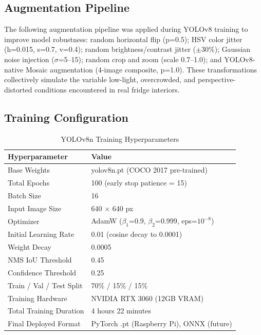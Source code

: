 \documentclass[12pt,a4paper]{report}
\begin{document}
\subsection{Augmentation Pipeline}
The following augmentation pipeline was applied during YOLOv8 training to improve model robustness: random horizontal flip (p=0.5); HSV color jitter (h=0.015, s=0.7, v=0.4); random brightness/contrast jitter ($\pm$30\%); Gaussian noise injection ($\sigma$=5--15); random crop and zoom (scale 0.7--1.0); and YOLOv8-native Mosaic augmentation (4-image composite, p=1.0). These transformations collectively simulate the variable low-light, overcrowded, and perspective-distorted conditions encountered in real fridge interiors.

\subsection{Training Configuration}

\begin{table}[ht]
\centering
\caption{YOLOv8n Training Hyperparameters}
\label{tab:training}
\begin{tabularx}{\textwidth}{L{0.40\textwidth} L{0.55\textwidth}}
\toprule
\textbf{Hyperparameter} & \textbf{Value} \\
\midrule
Base Weights & yolov8n.pt (COCO 2017 pre-trained) \\
Total Epochs & 100 (early stop patience = 15) \\
Batch Size & 16 \\
Input Image Size & 640 $\times$ 640 px \\
Optimizer & AdamW ($\beta_1$=0.9, $\beta_2$=0.999, eps=$10^{-8}$) \\
Initial Learning Rate & 0.01 (cosine decay to 0.0001) \\
Weight Decay & 0.0005 \\
NMS IoU Threshold & 0.45 \\
Confidence Threshold & 0.25 \\
Train / Val / Test Split & 70\% / 15\% / 15\% \\
Training Hardware & NVIDIA RTX 3060 (12GB VRAM) \\
Total Training Duration & 4 hours 22 minutes \\
Final Deployed Format & PyTorch .pt (Raspberry Pi), ONNX (future) \\
\bottomrule
\end{tabularx}
\end{table}
\end{document}

